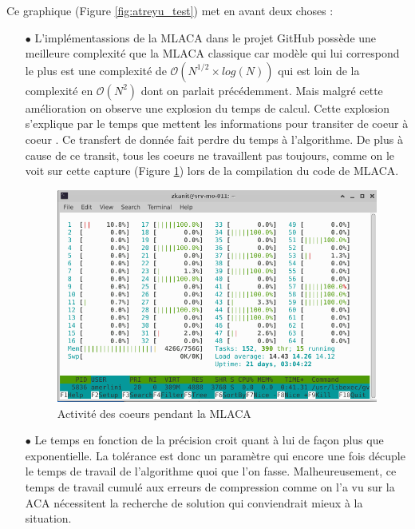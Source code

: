 \documentclass[10pt]{SelfArx} %
\begin{document}
Ce graphique (Figure \ref{fig:atreyu_test}) met en avant deux choses :
\begin{itemize}
    \item[$\bullet$] L'implémentassions de la MLACA dans le projet GitHub possède une meilleure complexité que la MLACA classique car modèle qui lui correspond le plus est une complexité de $\mathcal{O}(N^{1/2} \times log(N))$ qui est loin de la complexité en $\mathcal{O}(N^2)$ dont on parlait précédemment. Mais malgré cette amélioration on observe une explosion du temps de calcul. Cette explosion s'explique par le temps que mettent les informations pour transiter de coeur à coeur \cite{nel_efficient_2019}. Ce transfert de donnée fait perdre du temps à l'algorithme. De plus à cause de ce transit, tous les coeurs ne travaillent pas toujours, comme on le voit sur cette capture (Figure \ref{fig:htop}) lors de la compilation du code de MLACA. 
    
    \begin{figure}[ht]\centering
	    \includegraphics[width=\linewidth]{htop.png}
    	\captionsetup{justification=centering}
    	\caption{Activité des coeurs pendant la MLACA}
    	\label{fig:htop}
    \end{figure}
    
    \item[$\bullet$] Le temps en fonction de la précision croit quant à lui de façon plus que exponentielle. La tolérance est donc un paramètre qui encore une fois décuple le temps de travail de l'algorithme quoi que l'on fasse. Malheureusement, ce temps de travail cumulé aux erreurs de compression comme on l'a vu sur la ACA nécessitent la recherche de solution qui conviendrait mieux à la situation.
\end{itemize}
\end{document}
